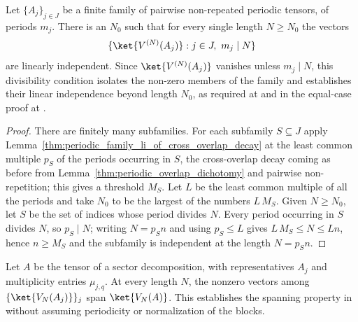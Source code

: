 \begin{lemma}%
    \label{thm:periodic_basis_nonzero_subfamily_li}
    \leanok
    Let $\{A_j\}_{j\in J}$ be a finite family of pairwise non-repeated
    periodic tensors, of periods $m_j$. There is an $N_0$ such that for every
    single length $N\ge N_0$ the vectors
    \begin{align}
        \{\ket{V^{(N)}(A_j)} : j\in J,\ m_j\mid N\}
        \notag
    \end{align}
    are linearly independent. Since $\ket{V^{(N)}(A_j)}$ vanishes unless
    $m_j\mid N$, this divisibility condition isolates the non-zero members of
    the family and establishes their linear independence beyond length $N_0$,
    as required at \cite[lines~604--608]{DeLasCuevas2017Irreducible} and in
    the equal-case proof at \cite[lines~677--679]{DeLasCuevas2017Irreducible}.
\end{lemma}

\begin{proof}\leanok
    There are finitely many subfamilies. For each subfamily $S\subseteq J$
    apply Lemma~\ref{thm:periodic_family_li_of_cross_overlap_decay} at the
    least common multiple $p_S$ of the periods occurring in $S$, the
    cross-overlap decay coming as before from
    Lemma~\ref{thm:periodic_overlap_dichotomy} and pairwise non-repetition;
    this gives a threshold $M_S$. Let $L$ be the least common multiple of all
    the periods and take $N_0$ to be the largest of the numbers $L\,M_S$.
    Given $N\ge N_0$, let $S$ be the set of indices whose period divides $N$.
    Every period occurring in $S$ divides $N$, so $p_S\mid N$; writing
    $N=p_Sn$ and using $p_S\le L$ gives $L\,M_S\le N\le Ln$, hence $n\ge M_S$
    and the subfamily is independent at the length $N=p_Sn$.
\end{proof}

\begin{lemma}
    \label{thm:periodic_basis_nonzero_spanning}
    \leanok
    Let $A$ be the tensor of a sector decomposition, with representatives
    $A_j$ and multiplicity entries $\mu_{j,q}$. At every length $N$, the
    nonzero vectors among $\{\ket{V_N(A_j)}\}_j$ span $\ket{V_N(A)}$.
    This establishes the spanning property in
    \cite[Proposition~3.3, lines~604--608]{DeLasCuevas2017Irreducible} without
    assuming periodicity or normalization of the blocks.
\end{lemma}

